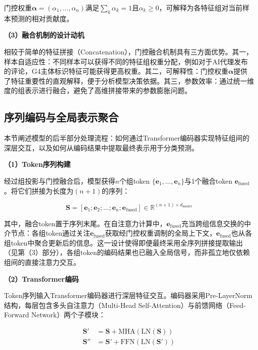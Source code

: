 门控权重$\boldsymbol{\alpha} = (\alpha_1, \ldots, \alpha_n)$满足$\sum_k \alpha_k = 1$且$\alpha_k \geq 0$，可解释为各特征组对当前样本预测的相对贡献度。

\textbf{（3）融合机制的设计动机}

相较于简单的特征拼接（Concatenation），门控融合机制具有三方面优势。其一，样本自适应性：不同样本可以获得不同的特征组权重分配，例如对于AI代理发布的评论，G4主体标识特征可能获得更高权重。其二，可解释性：门控权重$\boldsymbol{\alpha}$提供了特征重要性的直观解释，便于分析模型决策依据。其三，参数效率：通过统一维度的组表示进行融合，避免了高维拼接带来的参数膨胀问题。

\subsection{序列编码与全局表示聚合}

本节阐述模型的后半部分处理流程：如何通过Transformer编码器实现特征组间的深层交互，以及如何从编码结果中提取最终表示用于分类预测。

\textbf{（1）Token序列构建}

经过组投影与门控融合后，模型获得$n$个组token $\{\mathbf{e}_1, \ldots, \mathbf{e}_n\}$与1个融合token $\mathbf{e}_{\text{fused}}$。将它们拼接为长度为$(n+1)$的序列：

\begin{equation}
\mathbf{S} = [\mathbf{e}_1; \mathbf{e}_2; \ldots; \mathbf{e}_n; \mathbf{e}_{\text{fused}}] \in \mathbb{R}^{(n+1) \times d_{\text{model}}}
\end{equation}

其中，融合token置于序列末尾。在自注意力计算中，$\mathbf{e}_{\text{fused}}$充当跨组信息交换的中介节点：各组token通过关注$\mathbf{e}_{\text{fused}}$获取经门控权重调制的全局上下文，$\mathbf{e}_{\text{fused}}$也从各组token中聚合更新后的信息。这一设计使得即便最终采用全序列拼接提取输出（见第（3）部分），各组token的编码结果也已融入全局信号，而非孤立地仅依赖组间的直接注意力交互。

\textbf{（2）Transformer编码}

Token序列输入Transformer编码器进行深层特征交互。编码器采用Pre-LayerNorm结构\cite{xiong2020layer}，每层包含多头自注意力（Multi-Head Self-Attention）与前馈网络（Feed-Forward Network）两个子模块：

\begin{align}
\mathbf{S}' &= \mathbf{S} + \text{MHA}(\text{LN}(\mathbf{S})) \\
\mathbf{S}'' &= \mathbf{S}' + \text{FFN}(\text{LN}(\mathbf{S}'))
\end{align}

